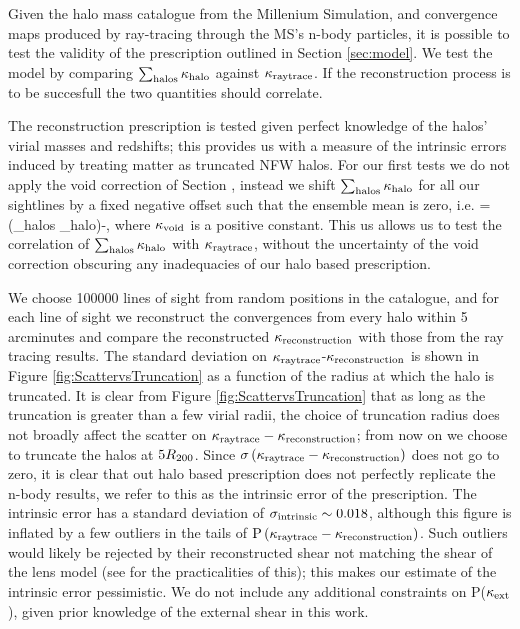 \documentclass[useAMS,usenatbib]{mn2e}
\begin{document}
Given the halo mass catalogue from the Millenium Simulation, and convergence maps produced by
ray-tracing through the MS's n-body particles, 
it is possible to test the validity of the prescription outlined in Section \ref{sec:model}. We test the model
 by comparing $\sum_{\rm halos} \kappa_{\rm halo}$ against $\kappa_{\rm raytrace}$. If the reconstruction process is to be
 succesfull the two quantities should correlate.

The reconstruction prescription is tested given perfect
knowledge of the halos' virial masses and redshifts; this provides us with a measure of the intrinsic
errors induced by treating matter as truncated NFW halos. For our first tests we do not apply the void correction of
Section \label{subsec:voids}, instead we shift $\sum_{\rm halos} \kappa_{\rm halo}$ for all our sightlines by a fixed negative offset such that the ensemble mean
is zero, i.e.
\be \label{eq:totalkappax}
\kapparec = \left(\sum_{\rm halos} \kappa_{\rm halo}\right)-\kappav,
\ee
where $\kappa_{\rm void}$ is a positive constant. This us allows us to test the correlation of $\sum_{\rm halos} \kappa_{\rm halo}$ with $\kappa_{\rm raytrace}$, without
 the uncertainty of the void correction obscuring any inadequacies of our halo based prescription.

We choose 100000 lines of sight from random positions in the catalogue, and for each line of sight we reconstruct the
convergences from every halo within 5 arcminutes and compare the reconstructed
$\kappa_{\rm reconstruction}$ with those from the ray tracing results. The standard deviation on $\kappa_{\rm raytrace}$-$\kappa_{\rm reconstruction}$ is
shown in Figure \ref{fig:ScattervsTruncation} as a function of the radius at which the halo is truncated.
 It is clear from Figure \ref{fig:ScattervsTruncation} 
that as long as the truncation is greater than a few virial radii, the choice of truncation
radius does not broadly affect the scatter on $\kappa_{\rm raytrace}-\kappa_{\rm reconstruction}$; from now on we choose 
to truncate the halos at $5 R_{200}$. Since $\sigma\left(\kappa_{\rm raytrace}-\kappa_{\rm reconstruction}\right)$ does not go to
zero, it is clear that out halo based prescription does not perfectly replicate the n-body results, we refer to this
 as the intrinsic error of the prescription.
 The intrinsic error has a standard deviation of $\sigma_{\rm intrinsic} \sim 0.018$, although
this figure is inflated by a few outliers in the tails of ${\rm P}\left(\kappa_{\rm raytrace}-\kappa_{\rm reconstruction}\right)$. Such outliers would 
likely be rejected by their reconstructed shear not matching the shear of the lens model 
(see \citet{WongEtal2011} for the practicalities of this);
 this makes our estimate of the intrinsic error pessimistic. We do not include any additional constraints on P($\kappa_{\rm ext}$), given prior knowledge of the external shear in this work.
\end{document}

